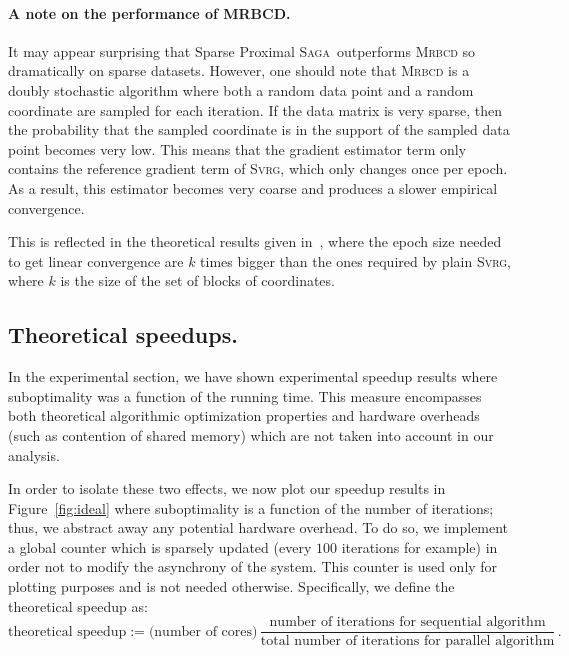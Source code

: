 \documentclass{article}
\newcommand{\SAGA}{\textsc{Saga}}
\newcommand{\SVRG}{\textsc{Svrg}}
\begin{document}
\vspace{-3mm}
\paragraph{A note on the performance of MRBCD.}
It may appear surprising that Sparse Proximal \SAGA\ outperforms \textsc{Mrbcd} so dramatically on sparse datasets.
However, one should note that \textsc{Mrbcd} is a doubly stochastic algorithm where both a random data point and a random coordinate are sampled for each iteration.
If the data matrix is very sparse, then the probability that the sampled coordinate is in the support of the sampled data point becomes very low.
This means that the gradient estimator term only contains the reference gradient term of \SVRG, which only changes once per epoch.
As a result, this estimator becomes very coarse and produces a slower empirical convergence.

This is reflected in the theoretical results given in~\citet{zhao2014accelerated}, where the epoch size needed to get linear convergence are $k$ times bigger than the ones required by plain \SVRG, where $k$ is the size of the set of blocks of coordinates.
\clearpage

\subsection{Theoretical speedups.}
In the experimental section, we have shown experimental speedup results where suboptimality was a function of the running time.
This measure encompasses both theoretical algorithmic optimization properties and hardware overheads (such as contention of shared memory) which are not taken into account in our analysis.

In order to isolate these two effects, we now plot our speedup results in Figure~\ref{fig:ideal} where suboptimality is a function of the number of iterations; thus, we abstract away any potential hardware overhead.
	To do so, we implement a global counter which is sparsely updated (every $100$ iterations for example) in order not to modify the asynchrony of the system.
	This counter is used only for plotting purposes and is not needed otherwise.
Specifically, we define the theoretical speedup as:
\begin{equation*}
\text{theoretical speedup} := \text{(number of cores)} \, \frac{\text{number of iterations for sequential algorithm}}{\text{total number of iterations for parallel algorithm}} \, .
\end{equation*}
\end{document}
